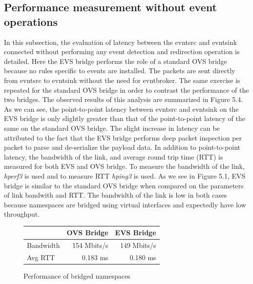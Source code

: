 \subsection{Performance measurement without event operations}
In this subsection, the evaluation of latency between the evntsrc and evntsink connected without performing any event detection and redirection operation is detailed. Here the EVS bridge performs the role of a standard OVS bridge because no rules specific to events are installed. The packets are sent directly from evntsrc to evntsink without the need for evntbroker. The same exercise is repeated for the standard OVS bridge in order to contrast the performance of the two bridges. The observed results of this analysis are summarized in Figure 5.4. As we can see, the point-to-point latency between evntsrc and evntsink on the EVS bridge is only slightly greater than that of the point-to-point latency of the same on the standard OVS bridge. The slight increase in latency can be attributed to the fact that the EVS bridge performs deep packet inspection per packet to parse and de-serialize the payload data. 
\newline
In addition to point-to-point latency, the bandwidth of the link, and average round trip time (RTT) is measured for both EVS and OVS bridge. To measure the bandwidth of the link, \textit{hperf3} is used and to measure RTT \textit{hping3} is used. As we see in Figure 5.1, EVS bridge is similar to the standard OVS bridge when compared on the parameters of link bandwith and RTT. The bandwidth of the link is  low in both  cases because namespaces are bridged using virtual interfaces and expectedly have low throughput.
\begin{figure}[H]
\centering
\caption{Performance of bridged namespaces}
\hfill
	\begin{tabular} {lrr}
	\toprule
	\hline
	&  OVS Bridge & EVS Bridge  \\ \midrule
	\hline 
	Bandwidth &  154 Mbits/s & 149 Mbits/s  \\ 
	\hline
	Avg RTT & 0.183 ms & 0.180 ms  \\ \bottomrule
	\hline	
\end{tabular}
\end{figure}


